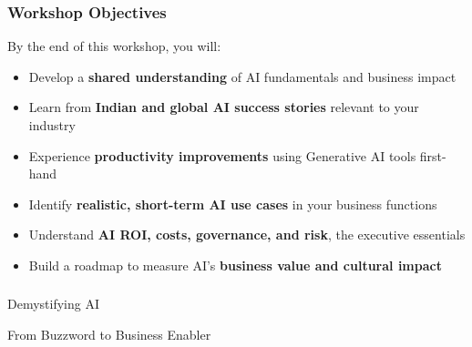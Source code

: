 \begin{frame}[fragile]\frametitle{Workshop Objectives}

By the end of this workshop, you will:
\begin{itemize}
  \item Develop a \textbf{shared understanding} of AI fundamentals and business impact
  \item Learn from \textbf{Indian and global AI success stories} relevant to your industry
  \item Experience \textbf{productivity improvements} using Generative AI tools first-hand
  \item Identify \textbf{realistic, short-term AI use cases} in your business functions
  \item Understand \textbf{AI ROI, costs, governance, and risk}, the executive essentials
  \item Build a roadmap to measure AI's \textbf{business value and cultural impact}
\end{itemize}

\end{frame}


\begin{frame}[fragile]\frametitle{}
\begin{center}
{\Large Demystifying AI}

{\small From Buzzword to Business Enabler}
\end{center}
\end{frame}

